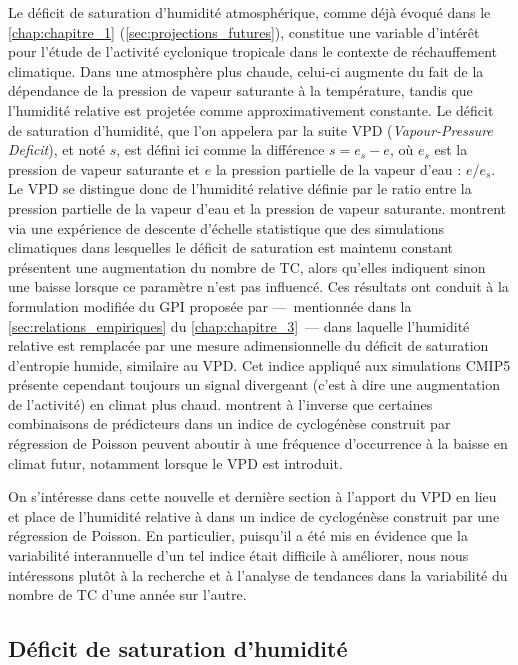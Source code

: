 \documentclass[../main.tex]{subfiles}
\begin{document}
Le déficit de saturation d'humidité atmosphérique, comme déjà évoqué dans le \cref{chap:chapitre_1} (\cref{sec:projections_futures}), constitue une variable
d'intérêt pour l'étude de l'activité cyclonique tropicale dans le contexte de réchauffement climatique. Dans une atmosphère plus chaude, celui-ci augmente du
fait de la dépendance de la pression de vapeur saturante à la température, tandis que l'humidité relative est projetée comme approximativement constante. Le
déficit de saturation d'humidité, que l'on appelera par la suite VPD (\textit{Vapour-Pressure Deficit}), et noté $s$, est défini ici comme la différence $s =
e_s - e$, où $e_s$ est la pression de vapeur saturante et $e$ la pression partielle de la vapeur d'eau : $e / e_s$. Le VPD se distingue donc de l'humidité
relative définie par le ratio entre la pression partielle de la vapeur d'eau et la pression de vapeur saturante. \textcite{emanuel_hurricanes_2008} montrent via
une expérience de descente d'échelle statistique que des simulations climatiques dans lesquelles le déficit de saturation est maintenu constant présentent une
augmentation du nombre de TC, alors qu'elles indiquent sinon une baisse lorsque ce paramètre n'est pas influencé. Ces résultats ont conduit à la formulation
modifiée du GPI proposée par \textcite{emanuel_tropical_2010} ---~mentionnée dans la \cref{sec:relations_empiriques} du \cref{chap:chapitre_3}~--- dans laquelle
l'humidité relative est remplacée par une mesure adimensionnelle du déficit de saturation d'entropie humide, similaire au VPD. Cet indice appliqué aux
simulations CMIP5 présente cependant toujours un signal divergeant (c'est à dire une augmentation de l'activité) en climat plus chaud.
\textcite{camargo_testing_2014} montrent à l'inverse que certaines combinaisons de prédicteurs dans un indice de cyclogénèse construit par régression de Poisson
peuvent aboutir à une fréquence d'occurrence à la baisse en climat futur, notamment lorsque le VPD est introduit.

On s'intéresse dans cette nouvelle et dernière section à l'apport du VPD en lieu et place de l'humidité relative à  dans un indice de cyclogénèse
construit par une régression de Poisson. En particulier, puisqu'il a été mis en évidence que la variabilité interannuelle d'un tel indice était difficile à
améliorer, nous nous intéressons plutôt à la recherche et à l'analyse de tendances dans la variabilité du nombre de TC d'une année sur l'autre.

\subsection{Déficit de saturation d'humidité}
\end{document}
